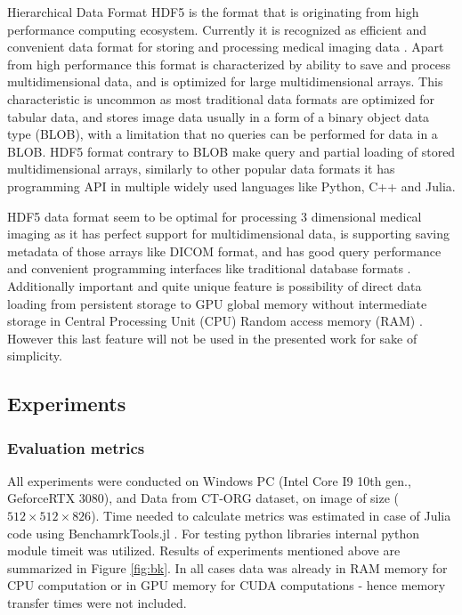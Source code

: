 \documentclass{juliacon}
\begin{document}
Hierarchical Data Format HDF5 \cite{hdf5} is the format that is originating from high performance computing ecosystem. Currently it is recognized as efficient and convenient data format for  storing and processing medical imaging data \cite{hdf5Medical}. Apart from high performance this format is characterized by ability to save and process multidimensional data, and is optimized for large multidimensional arrays. This characteristic is uncommon as most traditional data formats are optimized for tabular data, and stores image data usually in a form of a binary object data type (BLOB), with a limitation that no queries can be performed for data in a BLOB. HDF5 format contrary to BLOB make query and partial loading of stored multidimensional arrays, similarly to other popular data formats it has programming API in multiple widely used languages like Python, C++ and Julia.

HDF5 data format  seem to be optimal for processing 3 dimensional medical imaging as it has perfect support for multidimensional data, is supporting saving metadata of those arrays like DICOM format, and has good query performance and convenient programming interfaces like traditional database formats . Additionally important and quite unique feature is possibility of direct data loading from persistent storage to GPU global memory without intermediate storage in Central Processing Unit (CPU) Random access memory (RAM) \cite{hdf5GPU} . However this last feature will not be used in the presented work for sake of simplicity.

\subsection{Experiments}
\subsubsection{Evaluation metrics}
All experiments were conducted on Windows PC (Intel Core I9 10th gen., GeforceRTX 3080), and Data from CT-ORG \cite{CTORG} dataset, on image of size ($512 \times 512 \times 826$). Time needed to calculate metrics was estimated in case of Julia code using BenchamrkTools.jl \cite{BenchmarkTools}. For testing python libraries internal python module timeit was utilized. Results of experiments mentioned above are summarized in Figure \ref{fig:bk}. In all cases data was already in RAM memory for CPU computation or in GPU memory for CUDA computations - hence memory transfer times were not included.
\end{document}
